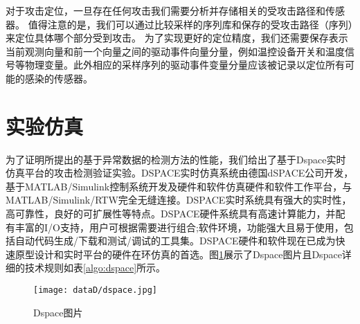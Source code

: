 对于攻击定位，一旦存在任何攻击我们需要分析并存储相关的受攻击路径和传感器。 值得注意的是，我们可以通过比较采样的序列库和保存的受攻击路径（序列）来定位具体哪个部分受到攻击。 为了实现更好的定位精度，我们还需要保存表示当前观测向量和前一个向量之间的驱动事件向量分量，例如温控设备开关和温度信号等物理变量。此外相应的采样序列的驱动事件变量分量应该被记录以定位所有可能的感染的传感器。

\section{实验仿真}
\label{sec:insertimage}


为了证明所提出的基于异常数据的检测方法的性能，我们给出了基于Dspace实时仿真平台的攻击检测验证实验。DSPACE实时仿真系统由德国dSPACE公司开发，基于MATLAB/Simulink控制系统开发及硬件和软件仿真硬件和软件工作平台，与MATLAB/Simulink/RTW完全无缝连接。DSPACE实时系统具有强大的实时性，高可靠性，良好的可扩展性等特点。DSPACE硬件系统具有高速计算能力，并配有丰富的I/O支持，用户可根据需要进行组合;软件环境，功能强大且易于使用，包括自动代码生成/下载和测试/调试的工具集。DSPACE硬件和软件现在已成为快速原型设计和实时平台的硬件在环仿真的首选。图\ref{fig112}展示了Dspace图片且Dspace详细的技术规则如表\ref{algo:dspace}所示。

	\begin{figure}[!htb]
		\centering
		\texttt{[image: dataD/dspace.jpg]}
		\caption{Dspace图片}
		\label{fig112}
	\end{figure}

